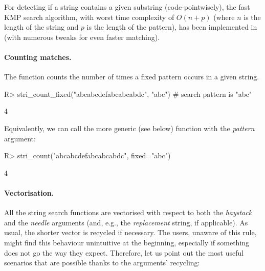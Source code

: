 \documentclass[nojss]{jss}
\begin{document}
For detecting if a string contains
a given substring  (code-pointwisely), the fast KMP \citep{KnuthETAL1977:kmp}
search algorithm, with worst time complexity of $O(n+p)$
(where $n$ is the length of the string and $p$ is the length of the pattern),
has been implemented in  (with numerous tweaks
for even faster matching).



\paragraph{Counting matches.}
The  function counts the number of
times a fixed pattern occurs in a given string.

\begin{Schunk}
\begin{Sinput}
R> stri_count_fixed("abcabcdefabcabcabdc", "abc")  # search pattern is "abc"
\end{Sinput}
\begin{Soutput}
[1] 4
\end{Soutput}
\end{Schunk}

Equivalently, we can call the more generic (see below)
function  with  the \textit{pattern} argument:

\begin{Schunk}
\begin{Sinput}
R> stri_count("abcabcdefabcabcabdc", fixed="abc")
\end{Sinput}
\begin{Soutput}
[1] 4
\end{Soutput}
\end{Schunk}



\paragraph{Vectorisation.}
All the string search functions are vectorised
with respect to both the  \textit{haystack} and the \textit{needle} arguments
(and, e.g., the \textit{replacement} string, if applicable).
As usual, the shorter vector is recycled if necessary.
The users, unaware of this rule, might find this behaviour
unintuitive at the beginning, especially if
something does not go the way they expect. Therefore, let us point out
the most useful scenarios that are possible thanks to the arguments' recycling:
\end{document}
